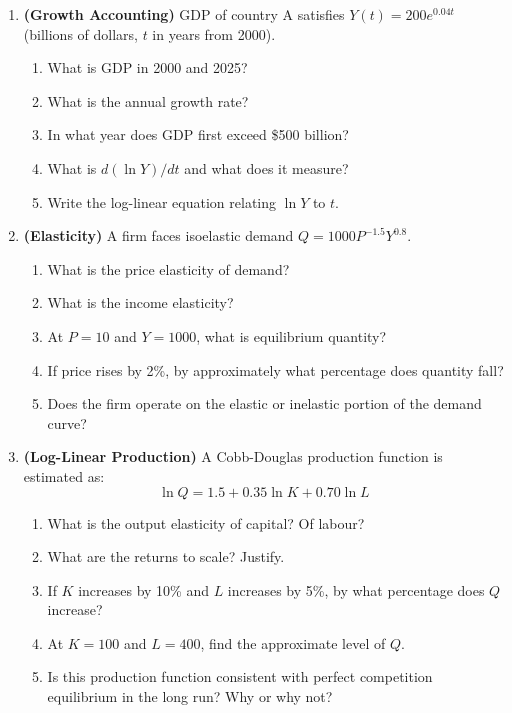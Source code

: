 \documentclass[12pt, a4paper]{article}
\theoremstyle{definition}
\begin{document}
\begin{enumerate}[label=\textbf{D\arabic*.}, leftmargin=2.5em]

\item \textbf{(Growth Accounting)} GDP of country A satisfies $Y(t) = 200e^{0.04t}$ (billions of dollars, $t$ in years from 2000).
\begin{enumerate}[label=(\alph*)]
  \item What is GDP in 2000 and 2025?
  \item What is the annual growth rate?
  \item In what year does GDP first exceed \$500 billion?
  \item What is $d(\ln Y)/dt$ and what does it measure?
  \item Write the log-linear equation relating $\ln Y$ to $t$.
\end{enumerate}

\item \textbf{(Elasticity)} A firm faces isoelastic demand $Q = 1000P^{-1.5}Y^{0.8}$.
\begin{enumerate}[label=(\alph*)]
  \item What is the price elasticity of demand?
  \item What is the income elasticity?
  \item At $P=10$ and $Y=1000$, what is equilibrium quantity?
  \item If price rises by 2\%, by approximately what percentage does quantity fall?
  \item Does the firm operate on the elastic or inelastic portion of the demand curve?
\end{enumerate}

\item \textbf{(Log-Linear Production)} A Cobb-Douglas production function is estimated as:
\[
  \ln Q = 1.5 + 0.35\ln K + 0.70\ln L
\]
\begin{enumerate}[label=(\alph*)]
  \item What is the output elasticity of capital? Of labour?
  \item What are the returns to scale? Justify.
  \item If $K$ increases by 10\% and $L$ increases by 5\%, by what percentage does $Q$ increase?
  \item At $K=100$ and $L=400$, find the approximate level of $Q$.
  \item Is this production function consistent with perfect competition equilibrium in the long run? Why or why not?
\end{enumerate}


\end{enumerate}
\end{document}
